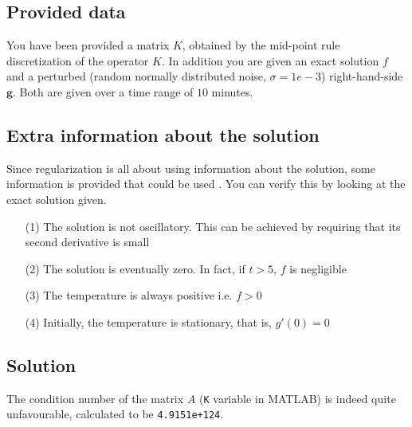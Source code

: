 \documentclass{article}
\begin{document}
	\subsection{Provided data}
	You have been provided a matrix $K$, obtained by the mid-point rule discretization of the operator
	$K$. In addition you are given an exact solution $f$ and a perturbed (random normally distributed noise, $\sigma = 1e-3$) right-hand-side $\mathbf{g}$. Both are given over a time range of
	$10$ minutes.
	\subsection{Extra information about the solution}
	Since regularization is all about using information about the solution, some information is provided that could be used . You can verify this by looking at the exact solution given. %
	\begin{itemize}
		\item[(1)] The solution is not oscillatory. This can be achieved by requiring that its second derivative is
		small
		\item[(2)] The solution is eventually zero. In fact, if $t > 5$, $f$ is negligible
		\item[(3)]The temperature is always positive i.e. $f > 0$
		\item[(4)]Initially, the temperature is stationary, that is, $g'(0) = 0$
	\end{itemize}
	
	\subsection{Solution}
	The condition number of the matrix $A$ (\texttt{K} variable in MATLAB) is indeed quite unfavourable, calculated to be \texttt{4.9151e+124}. 
\FloatBarrier
\pagebreak
\printbibliography
\end{document}

